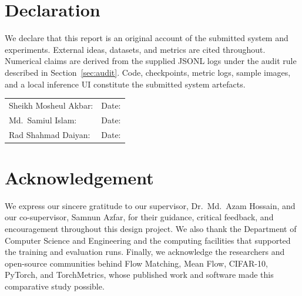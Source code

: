 ﻿%

\chapter*{Declaration}
We declare that this report is an original account of the submitted system and
experiments. External ideas, datasets, and metrics are cited throughout.
Numerical claims are derived from the supplied JSONL logs under the audit rule
described in Section~\ref{sec:audit}. Code, checkpoints, metric logs, sample
images, and a local inference UI constitute the submitted system artefacts.
\par\vspace{2cm}
\noindent\begin{tabularx}{\textwidth}{X p{}}
Sheikh Mosheul Akbar:\hrulefill  & Date:\hrulefill\\[2em]
Md.\ Samiul Islam:\hrulefill     & Date:\hrulefill\\[2em]
Rad Shahmad Daiyan:\hrulefill    & Date:\hrulefill
\end{tabularx}
\clearpage

\chapter*{Acknowledgement}
We express our sincere gratitude to our supervisor, Dr.\ Md.\ Azam Hossain, and
our co-supervisor, Samnun Azfar, for their guidance, critical feedback, and
encouragement throughout this design project. We also thank the Department of
Computer Science and Engineering and the computing facilities that supported the
training and evaluation runs. Finally, we acknowledge the researchers and
open-source communities behind Flow Matching, Mean Flow, CIFAR-10, PyTorch, and
TorchMetrics, whose published work and software made this comparative study
possible.
\clearpage

